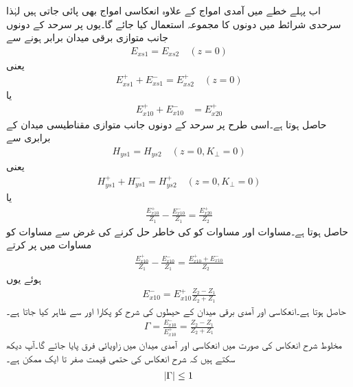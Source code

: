 اب پہلے خطے میں آمدی امواج کے علاوہ انعکاسی امواج بھی پائی جاتی ہیں لہٰذا سرحدی شرائط میں دونوں کا مجموعہ استعمال کیا جائے گا۔یوں  پر سرحد کے دونوں جانب متوازی برقی میدان برابر  ہونے سے
\begin{align*}
E_{xs1}=E_{xs2}    \quad (z=0)
\end{align*}
یعنی
\begin{align*}
E_{xs1}^+ +E_{xs1}^-=E_{xs2}^+ \quad (z=0)
\end{align*}
یا
\begin{align}\label{مساوات_موج_برقی_شرط_پورا}
E_{x10}^+ + E_{x10}^-&=E_{x20}^+
\end{align}
حاصل ہوتا ہے۔اسی طرح   پر سرحد کے دونوں جانب متوازی مقناطیسی میدان کے برابری سے
\begin{align*}
H_{ys1}=H_{ys2} \quad (z=0, K_\perp=0)
\end{align*}
یعنی
\begin{align*}
H_{ys1}^+ +H_{ys1}^-=H_{ys2}^+ \quad (z=0, K_\perp=0)
\end{align*}
یا
\begin{align}\label{مساوات_موج_مقناطیسی_شرط_پورا}
\frac{E_{x10}^+}{Z_1}-\frac{E_{x10}^-}{Z_1}=\frac{E_{x20}^+}{Z_2}
\end{align}
حاصل ہوتا ہے۔مساوات  اور مساوات  کو  کی خاطر حل کرنے کی غرض سے مساوات  کو مساوات  میں پر کرتے
\begin{align*}
\frac{E_{x10}^+}{Z_1}-\frac{E_{x10}^-}{Z_1}=\frac{E_{x10}^+ + E_{x10}^-}{Z_2}
\end{align*}
ہوئے یوں
\begin{align*}
E_{x10}^- =E_{x10}^+ \frac{Z_2-Z_1}{Z_2+Z_1}
\end{align*}
حاصل ہوتا ہے۔انعکاسی اور آمدی برقی میدان کے حیطوں کی شرح کو  پکارا  اور  سے ظاہر کیا جاتا ہے۔
\begin{align}\label{مساوات_موج_شرح_انعکاس_تعریف}
\Gamma=\frac{E_{x10}^-}{E_{x10}^+}=\frac{Z_2-Z_1}{Z_2+Z_1}
\end{align}
مخلوط شرح انعکاس کی صورت میں انعکاسی اور آمدی میدان میں زاویائی فرق پایا جائے گا۔آپ دیکھ سکتے ہیں کہ شرح انعکاس کی حتمی قیمت صفر تا ایک ممکن ہے۔
\begin{align}
\abs{\Gamma} \le 1
\end{align}


